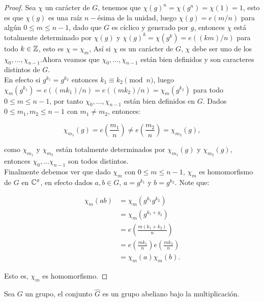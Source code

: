\begin{proof}
Sea $\chi$ un carácter de $G$, tenemos que $\chi(g)^n=\chi(g^n)=\chi(1)=1$, esto es que $\chi(g)$ es una raíz $n-$ésima de la unidad, luego $\chi(g)=e(m/n)$ para algún $0\leq m\leq n-1$, dado  que $G$ es cíclico y generado por $g$, entonces $\chi$ está totalmente determinado por $\chi(g)$ y $\chi(g)^k=\chi(g^k)=e((km)/n)$ para todo $k\in \mathbb{Z}$, esto es $\chi=\chi_m$, Así si $\chi$ es un carácter de $G$, $\chi$ debe ser uno de los $\chi_0,\ldots,\chi_{n-1}$.Ahora veamos que $\chi_0,\ldots,\chi_{n-1}$ están bien definidos y son caracteres distintos de $G$.\\

En efecto si $g^{k_1}=g^{k_2}$ entonces $k_1\equiv k_2\pmod{n}$, luego $\chi_m(g^{k_1})=e\left((mk_1)/n\right)=e\left((mk_2)/n\right)=\chi_m(g^{k_2})$ para todo $0\leq m\leq n-1$, por tanto $\chi_0,\ldots,\chi_{n-1}$ están bien definidos en $G$. Dados $0\leq m_1,m_2\leq n-1$ con $m_1\neq m_2$, entonces:

$$\displaystyle\chi_{m_1}(g)=e\left(\frac{m_1}{n}\right)\neq e\left(\frac{m_2}{n}\right)=\chi_{m_2}(g),$$

como $\chi_{m_1}$ y $\chi_{m_2}$ están totalmente determinados por $\chi_{m_1}(g)$ y $\chi_{m_2}(g)$, entonces $\chi_0,\ldots\chi_{n-1}$ son todos distintos.\\

Finalmente debemos ver que dado $\chi_m$ con $0\leq m\leq n-1$, $\chi_m$ es homomorfismo de $G$ en $\mathbb{C}^{x}$, en efecto dados $a,b\in G$, $a=g^{k_1}$ y $b=g^{k_2}$. Note que:

\begin{align*}
\chi_m(ab)&=\chi_m(g^{k_1}g^{k_2})\\
&=\chi_m(g^{k_1+g_2})\\
&=e\left(\frac{m(k_1+k_2)}{n}\right)\\
&=e\left(\frac{mk_1}{n}\right)e\left(\frac{mk_2}{n}\right)\\
&=\chi_m(a)\chi_m(b)
.\end{align*}

Esto es, $\chi_m$ es homomorfismo.
\end{proof}

\begin{theorem}
Sea $G$ un grupo, el  conjunto $\widehat{G}$ es un grupo abeliano bajo la multiplicación.
\end{theorem}


